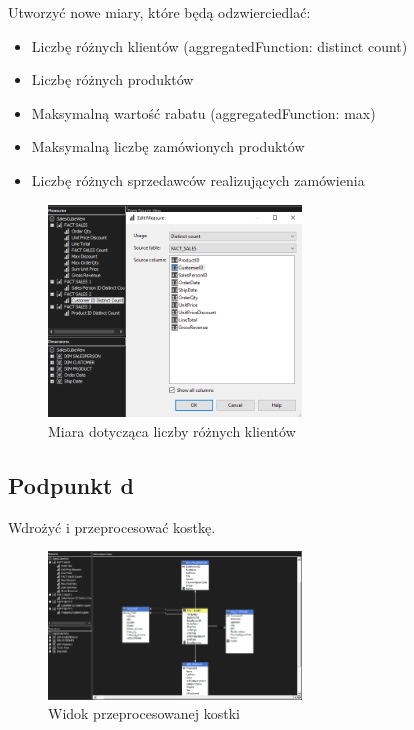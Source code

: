 \documentclass[a4paper,12pt]{article}
\begin{document}
Utworzyć nowe miary, które będą odzwierciedlać:

\begin{itemize}
  \item Liczbę różnych klientów (aggregatedFunction: distinct count)
  \item Liczbę różnych produktów
  \item Maksymalną wartość rabatu (aggregatedFunction: max)
  \item Maksymalną liczbę zamówionych produktów
  \item Liczbę różnych sprzedawców realizujących zamówienia
\end{itemize}

\begin{figure}[H]
  \centering
  \includegraphics[width=0.6\textwidth]{1c.png}
  \caption{Miara dotycząca liczby różnych klientów}
\end{figure}

\subsection{Podpunkt d}

Wdrożyć i przeprocesować kostkę.

\begin{figure}[H]
  \centering
  \includegraphics[width=0.6\textwidth]{1d.png}
  \caption{Widok przeprocesowanej kostki}
\end{figure}
\end{document}
